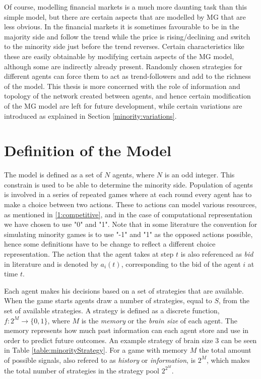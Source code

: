 Of course, modelling financial markets is a much more daunting task than this simple model, but there are certain aspects that are modelled by MG that are less obvious.
In the financial markets it is sometimes favourable to be in the majority side and follow the trend while the price is rising/declining and switch to the minority side just before the trend reverses.
Certain characteristics like these are easily obtainable by modifying certain aspects of the MG model, although some are indirectly already present.
Randomly chosen strategies for different agents can force them to act as trend-followers and add to the richness of the model.
This thesis is more concerned with the role of information and topology of the network created between agents, and hence certain modification of the MG model are left for future development, while certain variations are introduced as explained in Section \ref{minority:variations}.

\section{Definition of the Model}
\label{minority:definition}

The model is defined as a set of $N$ agents, where $N$ is an odd integer.
This constrain is used to be able to determine the minority side.
Population of agents is involved in a series of repeated games where at each round every agent has to make a choice between two actions.
These to actions can model various resources, as mentioned in \ref{1:competitive}, and in the case of computational representation we have chosen to use "0" and "1".
Note that in some literature the convention for simulating minority games is to use "-1" and "1" as the opposed actions possible, hence some definitions have to be change to reflect a different choice representation.
The action that the agent takes at step $t$ is also referenced as \textit{bid} in literature and is denoted by $a_i(t)$, corresponding to the bid of the agent $i$ at time $t$.

Each agent makes his decisions based on a set of strategies that are available. When the game starts agents draw a number of strategies, equal to $S$, from the set of available strategies.
A strategy is defined as a discrete function, $f:2^M\to\{0,1\}$, where $M$ is the \textit{memory} or the \textit{brain size} of each agent.
The memory represents how much past information can each agent store and use in order to predict future outcomes.
An example strategy of brain size $3$ can be seen in Table \ref{table:minorityStrategy}.
For a game with memory $M$ the total amount of possible signals, also refered to as \textit{history }or \textit{information}, is $2^M$, which makes the total number of strategies in the strategy pool $2^{2^M}$.

